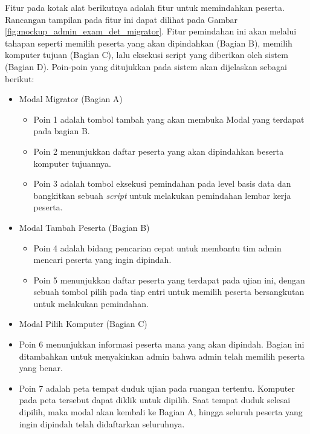     Fitur pada kotak alat berikutnya adalah fitur untuk memindahkan peserta. Rancangan tampilan pada fitur ini
    dapat dilihat pada Gambar \ref{fig:mockup_admin_exam_det_migrator}. Fitur pemindahan ini akan melalui tahapan
    seperti memilih peserta yang akan dipindahkan (Bagian B), memilih komputer tujuan (Bagian C), lalu
    eksekusi script yang diberikan oleh sistem (Bagian D).
    Poin-poin yang ditujukkan pada sistem akan dijelaskan sebagai berikut:
    \begin{itemize}
        \item Modal Migrator (Bagian A)
            \begin{itemize}
                \item Poin 1 adalah tombol tambah yang akan membuka Modal yang terdapat pada bagian B.
                
                \item Poin 2 menunjukkan daftar peserta yang akan dipindahkan beserta komputer tujuannya.
                
                \item Poin 3 adalah tombol eksekusi pemindahan pada level basis data dan bangkitkan sebuah
                    \textit{script} untuk melakukan pemindahan lembar kerja peserta.
            \end{itemize}
        
        \item Modal Tambah Peserta (Bagian B)
            \begin{itemize}
                \item Poin 4 adalah bidang pencarian cepat untuk membantu tim admin mencari peserta yang 
                    ingin dipindah.
                    
                \item Poin 5 menunjukkan daftar peserta yang terdapat pada ujian ini, dengan sebuah tombol
                    pilih pada tiap entri untuk memilih peserta bersangkutan untuk melakukan pemindahan.
            \end{itemize}
            
        \item Modal Pilih Komputer (Bagian C)
            \item Poin 6 menunjukkan informasi peserta mana yang akan dipindah. Bagian ini ditambahkan
                untuk menyakinkan admin bahwa admin telah memilih peserta yang benar.
                
            \item Poin 7 adalah peta tempat duduk ujian pada ruangan tertentu. Komputer pada peta tersebut dapat
                diklik untuk dipilih. Saat tempat duduk selesai dipilih, maka modal akan kembali ke Bagian A,
                hingga seluruh peserta yang ingin dipindah telah didaftarkan seluruhnya.
    \end{itemize}
    
